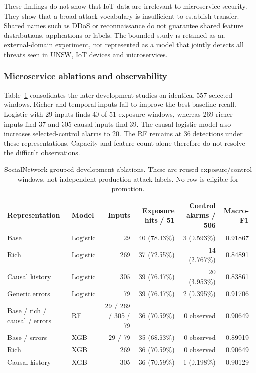 \documentclass[conference,a4paper]{IEEEtran}
\begin{document}
These findings do not show that IoT data are irrelevant to microservice security. They show that a broad attack vocabulary is insufficient to establish transfer. Shared names such as DDoS or reconnaissance do not guarantee shared feature distributions, applications or labels. The bounded study is retained as an external-domain experiment, not represented as a model that jointly detects all threats seen in UNSW, IoT devices and microservices.

\subsubsection{Microservice ablations and observability}
Table~\ref{syscall} consolidates the later development studies on identical 557 selected windows. Richer and temporal inputs fail to improve the best baseline recall. Logistic with 29 inputs finds 40 of 51 exposure windows, whereas 269 richer inputs find 37 and 305 causal inputs find 39. The causal logistic model also increases selected-control alarms to 20. The RF remains at 36 detections under these representations. Capacity and feature count alone therefore do not resolve the difficult observations.

\begin{table}[t]
\caption{SocialNetwork grouped development ablations. These are reused exposure/control windows, not independent production attack labels. No row is eligible for promotion.}
\label{syscall}\centering\footnotesize
\begin{tabular}{|l|l|r|r|r|r|}\hline
Representation & Model & Inputs & Exposure hits / 51 & Control alarms / 506 & Macro-F1\\\hline
Base & Logistic &29&40 (78.43\%)&3 (0.593\%)&0.91867\\\hline
Rich & Logistic &269&37 (72.55\%)&14 (2.767\%)&0.84891\\\hline
Causal history & Logistic &305&39 (76.47\%)&20 (3.953\%)&0.83861\\\hline
Generic errors & Logistic &79&39 (76.47\%)&2 (0.395\%)&0.91706\\\hline
Base / rich / causal / errors & RF &29 / 269 / 305 / 79&36 (70.59\%)&0 observed&0.90649\\\hline
Base / errors & XGB &29 / 79&35 (68.63\%)&0 observed&0.89919\\\hline
Rich & XGB &269&36 (70.59\%)&0 observed&0.90649\\\hline
Causal history & XGB &305&36 (70.59\%)&1 (0.198\%)&0.90129\\\hline
\end{tabular}
\end{table}
\end{document}
